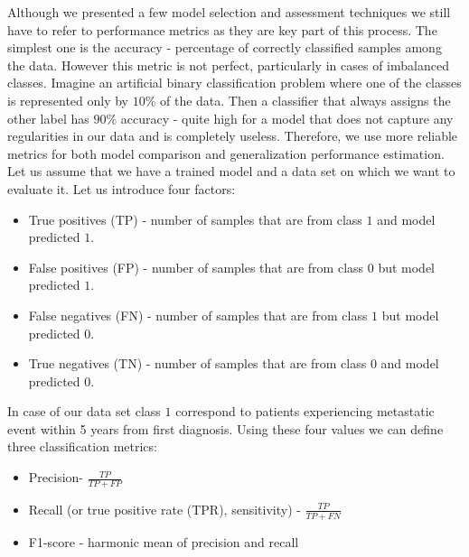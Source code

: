 \documentclass[12pt, wide]{mwart}
\begin{document}
Although we presented a few model selection and assessment techniques we still have to refer to performance metrics as they are key part of this process. The simplest one is the accuracy - percentage of correctly classified samples among the data. However this metric is not perfect, particularly in cases of imbalanced classes. Imagine an artificial binary classification problem where one of the classes is represented only by $10\%$ of the data. Then a classifier that always assigns the other label has $90\%$ accuracy - quite high for a model that does not capture any regularities in our data and is completely useless. Therefore, we use more reliable metrics for both model comparison and generalization performance estimation. Let us assume that we have a trained model and a data set on which we want to evaluate it. Let us introduce four factors:
\begin{itemize}
    \item True positives (TP) - number of samples that are from class $1$ and model predicted $1$.
    \item False positives (FP) - number of samples that are from class $0$ but model predicted $1$.
    \item False negatives (FN) - number of samples that are from class $1$ but model predicted $0$.
    \item True negatives (TN) - number of samples that are from class $0$ and model predicted $0$. 
\end{itemize}
In case of our data set class $1$ correspond to patients experiencing metastatic event within 5 years from first diagnosis. Using these four values we can define three classification metrics:
\begin{itemize}
    \item Precision- $\frac{TP}{TP + FP}$
    \item Recall (or true positive rate (TPR), sensitivity) - $\frac{TP}{TP + FN}$
    \item F1-score - harmonic mean of precision and recall
\end{itemize}
\end{document}
